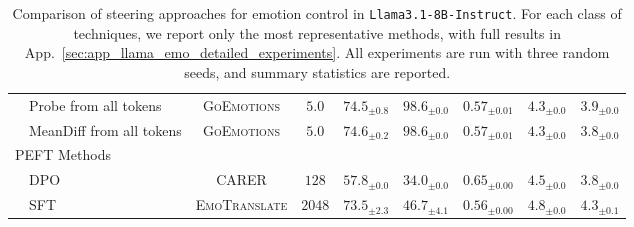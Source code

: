 \begin{table}[ht]
\begin{tabular}{@{}llcc|ccccc@{}}
\rowcolor{LightCyan} & Probe from all tokens        &\textsc{GoEmotions}&   $5.0$ & $74.5_{\scriptstyle\pm0.8}$& $98.6_{\scriptstyle\pm0.0}$& $0.57_{\scriptstyle\pm0.01}$& $4.3_{\scriptstyle\pm0.0}$& $3.9_{\scriptstyle\pm0.0}$\\
\rowcolor{WhiteColr} & MeanDiff from all tokens     &\textsc{GoEmotions}&   $5.0$ & $74.6_{\scriptstyle\pm0.2}$& $98.6_{\scriptstyle\pm0.0}$& $0.57_{\scriptstyle\pm0.01}$& $4.3_{\scriptstyle\pm0.0}$& $3.8_{\scriptstyle\pm0.0}$\\
\midrule
\multicolumn{4}{l}{PEFT Methods} &\\
\rowcolor{LightCyan} & DPO         &\textsc{CARER}& $128$ & $57.8_{\scriptstyle\pm0.0}$& $34.0_{\scriptstyle\pm0.0}$& $0.65_{\scriptstyle\pm0.00}$& $4.5_{\scriptstyle\pm0.0}$& $3.8_{\scriptstyle\pm0.0}$\\
\rowcolor{WhiteColr} & SFT         &\textsc{EmoTranslate}& $2048$ & $73.5_{\scriptstyle\pm2.3}$& $46.7_{\scriptstyle\pm4.1}$& $0.56_{\scriptstyle\pm0.00}$& $4.8_{\scriptstyle\pm0.0}$& $4.3_{\scriptstyle\pm0.1}$\\
\bottomrule[1.5pt]
\end{tabular}
\caption{Comparison of steering approaches for emotion control in \texttt{Llama3.1-8B-Instruct}. For each class of techniques, we report only the most representative methods, with full results in App.~\ref{sec:app_llama_emo_detailed_experiments}. All experiments are run with three random seeds, and summary statistics are reported.}
\label{tab:steering-agg}
\vspace{-4mm}
\end{table}

